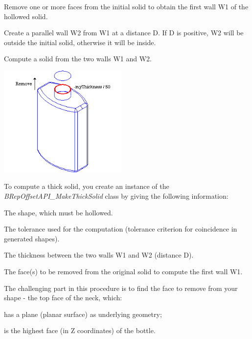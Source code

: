 \begin{DoxyItemize}
\item Remove one or more faces from the initial solid to obtain the first wall W1 of the hollowed solid.
\item Create a parallel wall W2 from W1 at a distance D. If D is positive, W2 will be outside the initial solid, otherwise it will be inside.
\item Compute a solid from the two walls W1 and W2.
\end{DoxyItemize}


\begin{DoxyImageNoCaption}
\begin{center}
   \mbox{\includegraphics[width=240]{tutorial_image010.png}}
\end{center}
\end{DoxyImageNoCaption}


To compute a thick solid, you create an instance of the {\itshape B\+Rep\+Offset\+A\+P\+I\+\_\+\+Make\+Thick\+Solid} class by giving the following information\+:


\begin{DoxyItemize}
\item The shape, which must be hollowed.
\item The tolerance used for the computation (tolerance criterion for coincidence in generated shapes).
\item The thickness between the two walls W1 and W2 (distance D).
\item The face(s) to be removed from the original solid to compute the first wall W1.
\end{DoxyItemize}

The challenging part in this procedure is to find the face to remove from your shape -\/ the top face of the neck, which\+:


\begin{DoxyItemize}
\item has a plane (planar surface) as underlying geometry;
\item is the highest face (in Z coordinates) of the bottle.
\end{DoxyItemize}


